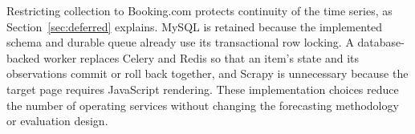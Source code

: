 Restricting collection to Booking.com protects continuity of the time series, as Section~\ref{sec:deferred} explains. MySQL is retained because the implemented schema and durable queue already use its transactional row locking. A database-backed worker replaces Celery and Redis so that an item's state and its observations commit or roll back together, and Scrapy is unnecessary because the target page requires JavaScript rendering. These implementation choices reduce the number of operating services without changing the forecasting methodology or evaluation design.

\clearpage
